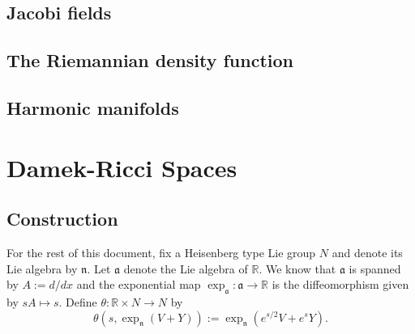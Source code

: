 \documentclass{amsart}
\newcommand{\R}{\mathbb R}
\newcommand{\n}{\mathfrak n}
\renewcommand{\a}{\mathfrak a}
\theoremstyle{plain}
\theoremstyle{definition}
\theoremstyle{remark}
\begin{document}
	
	
	\subsection{Jacobi fields}
	\subsection{The Riemannian density function}
	\subsection{Harmonic manifolds}
	
	
	
	\section{Damek-Ricci Spaces}
	\subsection{Construction} 
	For the rest of this document, fix a Heisenberg type Lie group $N$  and denote its Lie algebra by $\n$.
	Let $\a$ denote the Lie algebra of $\R$. We know that $\a$ is spanned by $A := d/dx$ and the exponential map 
	$\exp_{\a}: \a \rightarrow \R$ is the diffeomorphism given by $sA \mapsto s$.
	Define 
	$\theta:\R \times N \rightarrow N$ by 
	\begin{equation}
		\theta(s, \exp_{\n}(V + Y)) := \exp_{\n} (e^{s/2}V + e^s Y).
	\end{equation}
	
\end{document}
